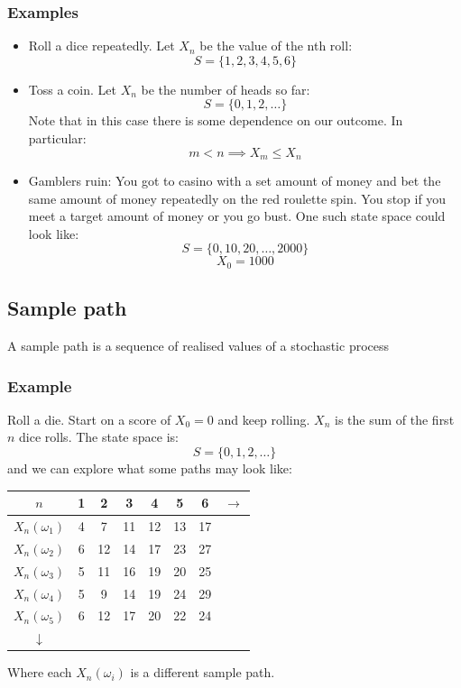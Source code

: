 \documentclass[12pt]{article}
\begin{document}
\subsubsection*{Examples}
\begin{itemize}
    \item Roll a dice repeatedly. Let \(X_n\) be the value of the nth roll:
        \[S=\{1,2,3,4,5,6\}\]
    \item Toss a coin. Let \(X_n\) be the number of heads so far:
        \[S=\{0,1,2,\dots\}\]
    Note that in this case there is some dependence on our outcome. In particular:
        \[m<n\implies X_m\leq X_n\]
    \item Gamblers ruin: You got to casino with a set amount of money and bet the same amount of money repeatedly on the red roulette spin. You stop if you meet a target amount of money or you go bust. One such state space could look like:
    \[S=\{0,10,20,\dots,2000\}\]
    \[X_0=1000\]
\end{itemize}
\subsection*{Sample path}
A sample path is a sequence of realised values of a stochastic process
\subsubsection*{Example}
Roll a die. Start on a score of \(X_0=0\) and keep rolling. \(X_n\) is the sum of the first \(n\) dice rolls. The state space is:
\[S=\{0,1,2,\dots\}\]
and we can explore what some paths may look like:
\begin{table}[H]
    \centering
    \begin{tabular}{c|c c c c c c c}
        \(n\) & 1 & 2 & 3 & 4 & 5 & 6 & \(\longrightarrow\) \\ \hline
        \(X_n(\omega_1)\) & 4 & 7 & 11 & 12 & 13 & 17 \\ 
        \(X_n(\omega_2)\) & 6 & 12 & 14 & 17 & 23 & 27 \\
        \(X_n(\omega_3)\) & 5 & 11 & 16 & 19 & 20 & 25 \\
        \(X_n(\omega_4)\) & 5 & 9 & 14 & 19 & 24 & 29 \\
        \(X_n(\omega_5)\) & 6 & 12 & 17 & 20 & 22 & 24 \\
        \(\downarrow\)
    \end{tabular}
\end{table}
Where each \(X_n(\omega_i)\) is a different sample path.
\end{document}
